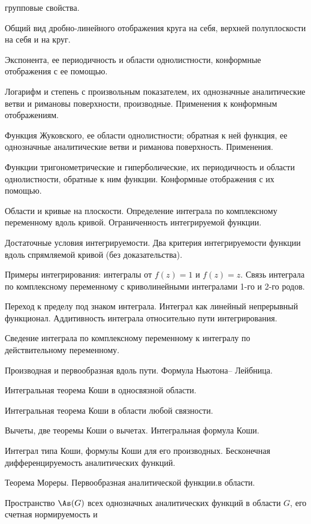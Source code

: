 \documentclass[a4paper]{article}
\begin{document}
\begin{nums}{-2}
      групповые свойства.
\item Общий вид дробно-линейного отображения круга на себя,  верхней  полуплоскости на себя и на круг.
\item Экспонента, ее периодичность и области однолистности, конформные отображения с ее помощью.
\item Логарифм и степень с произвольным показателем, их однозначные аналитические ветви и римановы поверхности,
      производные.  Применения  к  конформным отображениям.
\item Функция Жуковского, ее области однолистности; обратная к ней функция, ее однозначные аналитические
      ветви и риманова поверхность. Применения.
\item Функции тригонометрические и гиперболические, их периодичность  и области однолистности, обратные к ним
      функции. Конформные  отображения  с их помощью.
\item Области и кривые на плоскости. Определение интеграла по комплексному переменному вдоль кривой.
      Ограниченность интегрируемой функции.
\item Достаточные условия интегрируемости. Два критерия интегрируемости функции вдоль спрямляемой кривой
      (без доказательства).
\item Примеры интегрирования: интегралы от $f(z)=1$ и $f(z)=z$. Связь  интеграла по комплексному
      переменному с криволинейными интегралами 1-го и 2-го родов.
\item Переход к пределу под знаком интеграла. Интеграл как  линейный  непрерывный функционал. Аддитивность
      интеграла относительно пути интегрирования.
\item Сведение интеграла по комплексному переменному к интегралу по действительному переменному.
\item Производная и первообразная вдоль пути. Формула Ньютона-- Лейбница.
\item Интегральная теорема Коши в односвязной области.
\item Интегральная теорема Коши в области любой связности.
\item Вычеты, две теоремы Коши о вычетах. Интегральная формула Коши.
\item Интеграл типа Коши, формулы Коши для его производных. Бесконечная дифференцируемость аналитических функций.
\item Теорема Мореры. Первообразная аналитической функции.в области.
\item Пространство $\As(G)$ всех однозначных аналитических функций в области $G$, его счетная нормируемость и

\end{nums}
\end{document}

